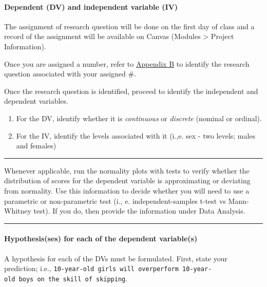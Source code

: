 \documentclass[
]{article}
\begin{document}
\hypertarget{dependent-dv-and-independent-variable-iv}{%
\paragraph{Dependent (DV) and independent variable (IV)}\label{dependent-dv-and-independent-variable-iv}}

The assignment of research question will be done on the first day of class and a record of the assignment will be available on Canvas (Modules \textgreater{} Project Information).

Once you are assigned a number, refer to \protect\hyperlink{appendix-b}{Appendix B} to identify the research question associated with your assigned \#.

Once the research question is identified, proceed to identify the independent and dependent variables.

\begin{enumerate}
\def\labelenumi{\alph{enumi}.}
\item
  For the DV, identify whether it is \emph{continuous} or \emph{discrete} (nominal or ordinal).
\item
  For the IV, identify the levels associated with it (i.,e. sex - two levels; males and females)
\end{enumerate}

\begin{center}\rule{0.5\linewidth}{0.5pt}\end{center}

Whenever applicable, run the normality plots with tests to verify whether the distribution of scores for the dependent variable is approximating or deviating from normality. Use this information to decide whether you will need to use a parametric or non-parametric test (i., e. independent-samples t-test vs Mann-Whitney test). If you do, then provide the information under Data Analysis.

\begin{center}\rule{0.5\linewidth}{0.5pt}\end{center}

\hypertarget{hypothesisses-for-each-of-the-dependent-variables}{%
\paragraph{Hypothesis(ses) for each of the dependent variable(s)}\label{hypothesisses-for-each-of-the-dependent-variables}}

A hypothesis for each of the DVs must be formulated. First, state your prediction; i.e., \texttt{10-year-old\ girls\ will\ overperform\ 10-year-old\ boys\ on\ the\ skill\ of\ skipping}.
\end{document}
